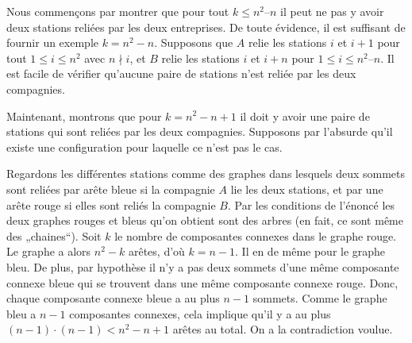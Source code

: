 \begin{sol}


Nous commençons par montrer que pour tout $k \leq n^2 – n$ il peut ne pas y avoir deux stations reliées par les deux entreprises. De toute évidence, il est suffisant de fournir un exemple $k =n^2 - n$.
Supposons que $ A$ relie les stations $i$ et $i+1$ pour tout $1 \leq i \leq n^2$ avec $n\nmid i$, et $B$ relie les stations $i$ et $i+n$ pour $1 \leq i \leq n^2 – n$.
 Il est facile de vérifier qu’aucune paire de stations n’est reliée par les deux compagnies.

Maintenant, montrons que pour $k=n^2-n+1$ il doit y avoir une paire de stations qui sont reliées par les deux compagnies. 
Supposons par l’absurde qu’il existe une configuration pour laquelle ce n’est pas le cas.

Regardons les différentes stations comme des graphes dans lesquels deux sommets sont reliées par arête bleue si la compagnie $A$ lie les deux stations, et par une arête rouge si elles sont reliés la compagnie $B$. Par les conditions de l’énoncé les deux graphes rouges et bleus qu’on obtient sont des arbres (en fait, ce sont même des „chaines“). Soit $k$ le nombre de composantes connexes dans le graphe rouge. Le graphe a alors $n^2-k $ arêtes, d’où $k = n-1$. Il en de même pour le graphe bleu. De plus, par hypothèse il n’y a pas deux sommets d’une même composante connexe bleue qui se trouvent dans une même composante connexe rouge. Donc, chaque composante connexe bleue a au plus $n-1$ sommets. Comme le graphe bleu a $n-1$ composantes connexes, cela implique qu’il y a au plus $(n-1) \cdot (n-1) < n^2-n + 1$ arêtes au total. On a la contradiction voulue.\\
\end{sol}


